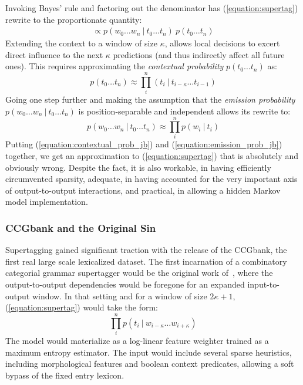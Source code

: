 Invoking Bayes' rule and factoring out the denominator has (\ref{equation:supertag}) rewrite to the proportionate quantity:
\begin{align}
\propto p(w_0\dots w_n \ | \ t_0\dots t_n)~ p(t_0\dots t_n)
\end{align}
Extending the context to a window of size $\kappa$, allows local decisions to excert direct influence to the next $\kappa$ predictions (and thus indirectly affect all future ones).
This requires approximating the \textit{contextual probability} $p(t_0 \dots t_n)$ as:
\begin{equation}\label{equation:contextual_prob_jb}
p(t_0 \dots t_n) \approx \prod_i^n (t_i \ | \ t_{i-\kappa}\dots t_{i-1})
\end{equation}
Going one step further and making the assumption that the \textit{emission probability} $p(w_0\dots w_n \ | \ t_0\dots t_n)$ is position-separable and independent allows its rewrite to:
\begin{equation}\label{equation:emission_prob_jb}
p(w_0\dots w_n \ | \ t_0\dots t_n) \approx \prod_i^n p(w_i \ | \ t_i)
\end{equation}
Putting (\ref{equation:contextual_prob_jb}) and (\ref{equation:emission_prob_jb}) together, we get an approximation to (\ref{equation:supertag}) that is absolutely and obviously wrong.
Despite the fact, it is also workable, in having efficiently circumvented sparsity, adequate, in having accounted for the very important axis of output-to-output interactions, and practical, in allowing a hidden Markov model implementation.


\subsubsection{CCGbank and the Original Sin}
Supertagging gained significant traction with the release of the CCGbank, the first real large scale lexicalized dataset.
The first incarnation of a combinatory categorial grammar supertagger would be the original work of~\citet{clark2002supertagging}, where the output-to-output dependencies would be foregone for an expanded input-to-output window.
In that setting and for a window of size $2\kappa + 1$, (\ref{equation:supertag}) would take the form:
\begin{equation}
	\prod_i^n p(t_i \ | \ w_{i-\kappa} \dots w_{i+\kappa})
\end{equation}
The model would materialize as a log-linear feature weighter trained as a maximum entropy estimator.
The input would include several sparse heuristics, including morphological features and boolean context predicates, allowing a soft bypass of the fixed entry lexicon.

